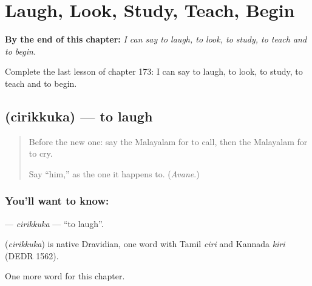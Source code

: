 
\chapter{Laugh, Look, Study, Teach, Begin}
\label{ch:ml-laugh-look-study-teach-begin}

\begin{chapteropening}
\textbf{By the end of this chapter:} \emph{I can say to laugh, to look, to study, to teach and to begin.}

Complete the last lesson of chapter 173: I can say to laugh, to look, to study, to teach and to begin.
\end{chapteropening}

\section[\texorpdfstring{\ml{ചിരിക്കുക} (cirikkuka)}{ചിരിക്കുക (cirikkuka)}]{ (cirikkuka) — to laugh}

\label{lesson:ML-C173-cirikkuka}



\begin{quote}
Before the new one: say the Malayalam for to call, then the Malayalam for to cry.

Say \textquotedblleft{}him,\textquotedblright{} as the one it happens to. (\emph{Avane}.)
\end{quote}

\subsection*{You'll want to know: }
\textbf{} — \emph{cirikkuka} — \textquotedblleft{}to laugh\textquotedblright{}.

\begin{cousinweb}
\textbf{} (\emph{cirikkuka}) is native Dravidian, one word with Tamil \emph{ciri} and Kannada \emph{kiri} (DEDR 1562).
\end{cousinweb}

\begin{grammarlens}[title={What you've built}]
One more word for this chapter.
\end{grammarlens}

